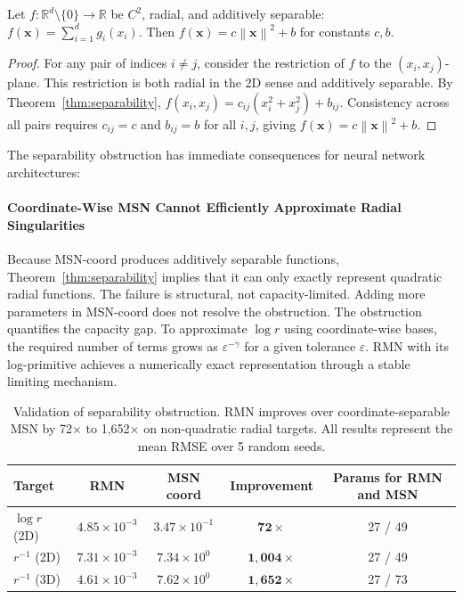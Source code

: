 \documentclass[twoside,11pt]{article}
\newcommand{\R}{\mathbb{R}}
\newcommand{\bx}{\bm{x}}
\newcommand{\norm}[1]{\left\|#1\right\|}
\begin{document}
\begin{proposition}
	\label{prop:higher_dim}
	Let $f: \R^d \setminus \{0\} \to \R$ be $C^2$, radial, and additively separable: $f(\bx) = \sum_{i=1}^d g_i(x_i)$. Then $f(\bx) = c\norm{\bx}^2 + b$ for constants $c, b$.
\end{proposition}

\begin{proof}
	For any pair of indices $i \neq j$, consider the restriction of $f$ to the $(x_i, x_j)$-plane. This restriction is both radial in the 2D sense and additively separable. By Theorem~\ref{thm:separability}, $f(x_i, x_j) = c_{ij}(x_i^2 + x_j^2) + b_{ij}$. Consistency across all pairs requires $c_{ij} = c$ and $b_{ij} = b$ for all $i, j$, giving $f(\bx) = c\norm{\bx}^2 + b$.
\end{proof}


The separability obstruction has immediate consequences for neural network architectures:
\paragraph{Coordinate-Wise MSN Cannot Efficiently Approximate Radial Singularities} Because MSN-coord produces additively separable functions, Theorem~\ref{thm:separability} implies that it can only exactly represent quadratic radial functions. The failure is structural, not capacity-limited. Adding more parameters in MSN-coord does not resolve the obstruction. The obstruction quantifies the capacity gap. To approximate $\log r$ using coordinate-wise bases, the required number of terms grows as $\varepsilon^{-\gamma}$ for a given tolerance $\varepsilon$. RMN with its log-primitive achieves a numerically exact representation through a stable limiting mechanism.

\begin{table}[t]
	\centering
		\begin{tabular}{lcccc}
			\toprule
			Target        & RMN                   & MSN coord             & Improvement              & Params for RMN and MSN \\
			\midrule
			$\log r$ (2D) & $4.85 \times 10^{-3}$ & $3.47 \times 10^{-1}$ & $\mathbf{72\times}$      & 27 / 49                \\
			$r^{-1}$ (2D) & $7.31 \times 10^{-3}$ & $7.34 \times 10^{0}$  & $\mathbf{1{,}004\times}$ & 27 / 49                \\
			$r^{-1}$ (3D) & $4.61 \times 10^{-3}$ & $7.62 \times 10^{0}$  & $\mathbf{1{,}652\times}$ & 27 / 73                \\
			\bottomrule
		\end{tabular}
	\caption{Validation of separability obstruction. RMN improves over coordinate-separable MSN by 72$\times$ to 1,652$\times$ on non-quadratic radial targets. All results represent the mean RMSE over 5 random seeds.}
	\label{tab:obstruction_validation}

\end{table}
\end{document}

